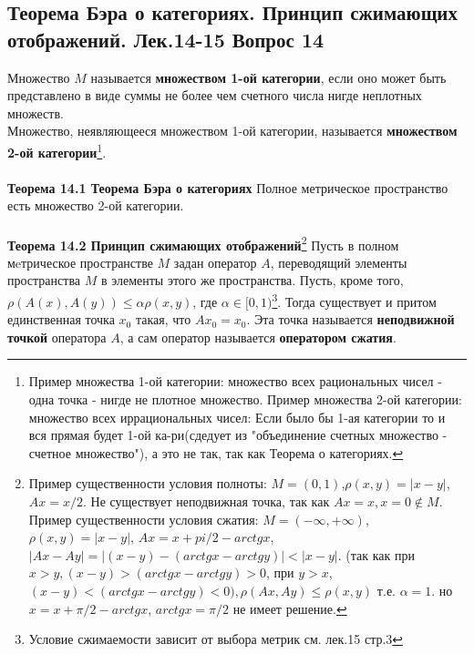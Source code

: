 \documentclass{article}
\begin{document}
\subsection{Теорема Бэра о категориях. Принцип сжимающих отображений. Лек.14-15 \textbf{Вопрос 14}}
	Множество $M$ называется \textbf{множеством 1-ой категории}, если оно может быть представлено в виде суммы не более чем счетного числа нигде неплотных множеств.\\
	Множество, неявляющееся множеством 1-ой категории, называется \textbf{множеством 2-ой категории}\footnote{Пример множества 1-ой категории: множество всех рациональных чисел - одна точка - нигде не плотное множество. Пример множества 2-ой категории: множество всех иррациональных чисел: Если было бы 1-ая категории то и вся прямая будет 1-ой ка-ри(сдедует из "объединение счетных множество - счетное множество"), а это не так, так как Теорема о категориях.}.\\
	\\
	\textbf{Теорема 14.1 Теорема Бэра о категориях} Полное метрическое пространство есть множество 2-ой категории.\\
	\\
	\textbf{Теорема 14.2 Принцип сжимающих отображений}\footnote{Пример существенности условия полноты: $M=(0,1)$,$\rho(x,y)=|x-y|$, $Ax=x/2$. Не существует неподвижная точка, так как $Ax=x, x=0\notin M$.\\
	Пример существенности условия сжатия: $M=(-\infty,+\infty)$, $\rho(x,y)=|x-y|$, $Ax=x+pi/2-arctgx$, $|Ax-Ay|=|(x-y)-(arctgx-arctgy)|<|x-y|$. (так как при $x>y,(x-y)>(arctgx-arctgy)>0$, при $y>x$, $(x-y)<(arctgx-arctgy)<0), \rho(Ax,Ay)\le \rho(x,y)$ т.е. $\alpha=1$. но $x=x+\pi/2-arctgx$, $arctgx =\pi/2$ не имеет решение.} Пусть в полном мeтрическое пространстве $M$ задан оператор $A$, переводящий элементы пространства $M$ в элементы этого же пространства. Пусть, кроме того, $\rho(A(x),A(y))\le \alpha\rho(x,y)$, где $\alpha \in [0,1)$\footnote{Условие сжимаемости зависит от выбора метрик см. лек.15 стр.3}. Тогда существует и притом единственная точка ${x}_{0}$ такая, что $A{x}_{0}={x}_{0}$. Эта точка называется \textbf{неподвижной точкой} оператора $A$, а сам оператор называется \textbf{оператором сжатия}.\\ 
\end{document}
